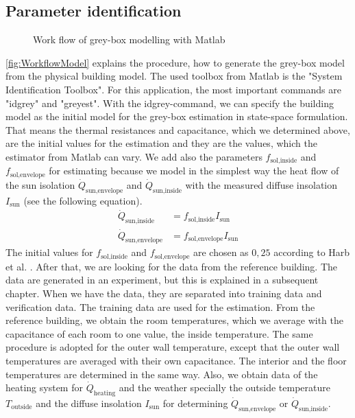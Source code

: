     \subsection{Parameter identification}
    \label{WorkflowModel}
     \begin{figure}
     \label{fig:workflowModel}
            \centering
            \def\svgwidth{400pt}
            
            \caption{Work flow of grey-box modelling with Matlab}
    \end{figure}
    \autoref{fig:WorkflowModel} explains the procedure, how to generate the grey-box model from the physical building model.\newline 
    The used toolbox from Matlab is the "System Identification Toolbox". For this application, the most important commands are "idgrey" and "greyest".
    With the idgrey-command, we can specify the building model as the initial model for the grey-box estimation in state-space formulation. That means the thermal resistances and capacitance, which we determined above, are the initial values for the estimation and they are the values, which the estimator from Matlab can vary. We add also the parameters $f_\text{sol,inside}$ and $f_\text{sol,envelope}$ for estimating because we model in the simplest way the heat flow of the sun isolation $\dot{Q}_\text{sun,envelope}$ and $\dot{Q}_\text{sun,inside}$ with the measured diffuse insolation $I_\text{sun}$ (see the following equation). 
    \begin{align}
       \label{eq:sun}
        \dot{Q}_\text{sun,inside} &= f_\text{sol,inside} I_\text{sun} \\
        \dot{Q}_\text{sun,envelope} &= f_\text{sol,envelope} I_\text{sun} \nonumber 
    \end{align}
    The initial values for $f_\text{sol,inside}$ and $f_\text{sol,envelope}$ are chosen as $0,25$ according to Harb et al. \cite{Harb.2016}.\newline
    After that, we are looking for the data from the reference building. The data are generated in an experiment, but this is explained in a subsequent chapter. When we have the data, they are separated into training data and verification data. The training data are used for the estimation. From the reference building, we obtain the room temperatures, which we average with the capacitance of each room to one value, the inside temperature. The same procedure is adopted for the outer wall temperature, except that the outer wall temperatures are averaged with their own capacitance. The interior and the floor temperatures are determined in the same way. Also, we obtain data of the heating system for $\dot{Q}_\text{heating}$ and the weather specially the outside temperature $T_\text{outside}$ and the diffuse insolation $I_\text{sun}$ for determining $\dot{Q}_\text{sun,envelope}$ or $\dot{Q}_\text{sun,inside}$. \newline
